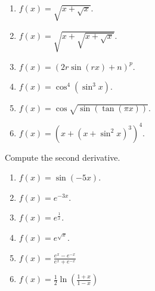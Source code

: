 \begin{problem}
\begin{multicols}{2}
\begin{enumerate}
\item $\displaystyle f(x)= \sqrt{x+\sqrt{x}}$.

\item $\displaystyle f(x)= \sqrt{x+\sqrt{x+\sqrt{x}}}$.

\item $\displaystyle f(x)=(2r \sin (r x)+n)^p $.

\item $\displaystyle f(x)=\cos^4(\sin^3 x) $.

\item $\displaystyle f(x)=\cos \sqrt{\sin (\tan (\pi x))} $.

\item $\displaystyle f(x)=\left(x+(x+\sin^2 x)^3 \right)^4 $.

\end{enumerate}
\end{multicols}
\end{problem}
\begin{problem}Compute the second derivative.
\begin{multicols}{3}
\begin{enumerate}
\item $\displaystyle f(x)=\sin (-5x)$. 

\item $\displaystyle f(x)=e^{-3x}$. 

\answer{$ $}
\item $\displaystyle f(x)=e^{\frac{1}x}$. 

\answer{$ $}
\item $\displaystyle f(x)=e^{\sqrt{x}}$. 

\answer{$ $}
\item $\displaystyle f(x)=\frac{e^{x}-e^{-x}}{e^x+e^{-x}} $

\answer{$ $}
\item $\displaystyle f(x)=\frac{1}2\ln \left(\frac{1+x}{1-x}\right) $

\answer{$ $}
\end{enumerate}
\end{multicols}
\end{problem}